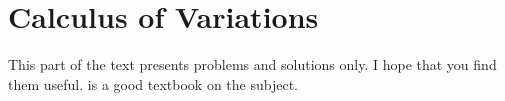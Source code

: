 \part{Calculus of Variations}

This part of the text presents problems and solutions only.  I hope that 
you find them useful.  \cite{wan:1995} is a good textbook on the subject.


